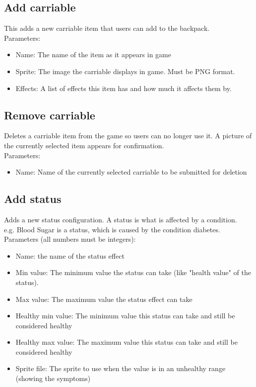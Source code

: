 \documentclass[a4paper,12pt]{article}
\begin{document}
\subsection*{Add carriable}
This adds a new carriable item that users can add to the backpack.\\
Parameters:
\begin{itemize}
	\setlength\itemsep{0em}
	\item Name: The name of the item as it appears in game
	\item Sprite: The image the carriable displays in game. Must be PNG format.
	\item Effects: A list of effects this item has and how much it affects them by.
\end{itemize}

\subsection*{Remove carriable}
Deletes a carriable item from the game so users can no longer use it. A picture of the currently
selected item appears for confirmation.\\
Parameters:
\begin{itemize}
	\setlength\itemsep{0em}
	\item Name: Name of the currently selected carriable to be submitted for deletion
\end{itemize}

\newpage

\subsection*{Add status}
Adds a new status configuration. A status is what is affected by a condition.\\
e.g. Blood Sugar is a status, which is caused by the condition diabetes.\\
Parameters (all numbers must be integers):
\begin{itemize}
	\setlength\itemsep{0em}
	\item Name: the name of the status effect
	\item Min value: The minimum value the status can take (like "health value" of the status).
	\item Max value: The maximum value the status effect can take
	\item Healthy min value: The minimum value this status can take and still be considered healthy
	\item Healthy max value: The maximum value this status can take and still be considered healthy
	\item Sprite file: The sprite to use when the value is in an unhealthy range (showing the symptoms)
\end{itemize}
\end{document}

